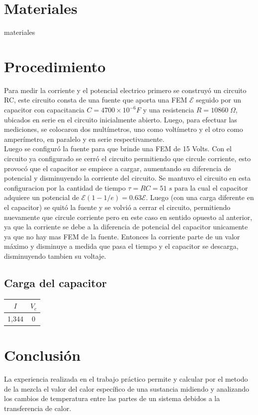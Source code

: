\documentclass[11pt, letterpaper]{article}
\begin{document}
\section{Materiales}
    materiales

\pagebreak
\section{Procedimiento}
Para medir la corriente y el potencial electrico primero se construyó un circuito
RC, este circuito consta de una fuente que aporta una FEM $\mathcal{E}$ seguido por
un capacitor con capacitancia $C=4700\times10^{-6}F$ y 
una resistencia $R=10860\;\Omega$, ubicados en serie en el circuito
inicialmente abierto. Luego, para efectuar las mediciones, se colocaron dos multímetros,
uno como voltímetro y el otro como amperímetro, en paralelo y en serie respectivamente.\\
Luego se configuró la fuente para que brinde una FEM de 15 Volts.
Con el circuito ya configurado se cerró el circuito permitiendo que circule corriente,
esto provocó que el capacitor se empiece a cargar, aumentando su diferencia de potencial
y disminuyendo la corriente del circuito. Se mantuvo el circuito en esta configuracion por
la cantidad de tiempo $\tau = RC = 51\;s$ para la cual el capacitor adquiere un potencial
de $\mathcal{E}(1-1/e) = 0.63\mathcal{E}$. Luego (con una carga diferente en el capacitor)
se quitó la fuente y se volvió a cerrar el circuito, permitiendo nuevamente que circule
corriente pero en este caso en sentido opuesto al anterior, ya que la corriente se debe
a la diferencia de potencial del capacitor unicamente ya que no hay mas FEM de la fuente.
Entonces la corriente parte de un valor máximo y disminuye a medida que pasa el tiempo
y el capacitor se descarga, disminuyendo tambien su voltaje.
\subsection{Carga del capacitor}
\begin{tabular}{ || c | c || }
    \hline
    $I$ & $V_c$\\
    \hline\hline
    1,344 & 0\\
    \hline
\end{tabular}
\pagebreak
\section{Conclusión}
La experiencia realizada en el trabajo práctico permite y calcular
por el metodo de la mezcla el valor del calor específico de una sustancia
midiendo y analizando los cambios de temperatura entre las partes de un sistema
debidos a la transferencia de calor.
\end{document}
